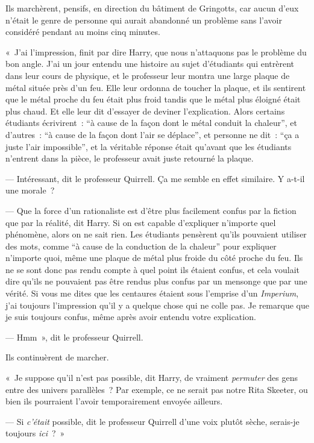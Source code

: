 Ils marchèrent, pensifs, en direction du bâtiment de Gringotts, car aucun d'eux n'était le genre de personne qui aurait abandonné un problème sans l'avoir considéré pendant au moins cinq minutes.

«~J'ai l'impression, finit par dire Harry, que nous n'attaquons pas le problème du bon angle.
J'ai un jour entendu une histoire au sujet d'étudiants qui entrèrent dans leur cours de physique, et le professeur leur montra une large plaque de métal située près d'un feu.
Elle leur ordonna de toucher la plaque, et ils sentirent que le métal proche du feu était plus froid tandis que le métal plus éloigné était plus chaud.
Et elle leur dit d'essayer de deviner l'explication.
Alors certains étudiants écrivirent~: “à cause de la façon dont le métal conduit la chaleur”, et d'autres~: “à cause de la façon dont l'air se déplace”, et personne ne dit~: “ça a juste l'air impossible”, et la véritable réponse était qu'avant que les étudiants n'entrent dans la pièce, le professeur avait juste retourné la plaque.

--- Intéressant, dit le professeur Quirrell.
Ça me semble en effet similaire.
Y a-t-il une morale~?

--- Que la force d'un rationaliste est d'être plus facilement confus par la fiction que par la réalité, dit Harry.
Si on est capable d'expliquer n'importe quel phénomène, alors on ne sait rien.
Les étudiants pensèrent qu'ils pouvaient utiliser des mots, comme “à cause de la conduction de la chaleur” pour expliquer n'importe quoi, même une plaque de métal plus froide du côté proche du feu.
Ils ne se sont donc pas rendu compte à quel point ils étaient confus, et cela voulait dire qu'ils ne pouvaient pas être rendus plus confus par un mensonge que par une vérité.
Si vous me dites que les centaures étaient sous l'emprise d'un \emph{Imperium}, j'ai toujours l'impression qu'il y a quelque chose qui ne colle pas.
Je remarque que je suis toujours confus, même après avoir entendu votre explication.

--- Hmm~», dit le professeur Quirrell.

Ils continuèrent de marcher.

«~Je suppose qu'il n'est pas possible, dit Harry, de vraiment \emph{permuter} des gens entre des univers parallèles~?
Par exemple, ce ne serait pas notre Rita Skeeter, ou bien ils pourraient l'avoir temporairement envoyée ailleurs.

--- Si \emph{c'était} possible, dit le professeur Quirrell d'une voix plutôt sèche, serais-je toujours \emph{ici}~?~»

